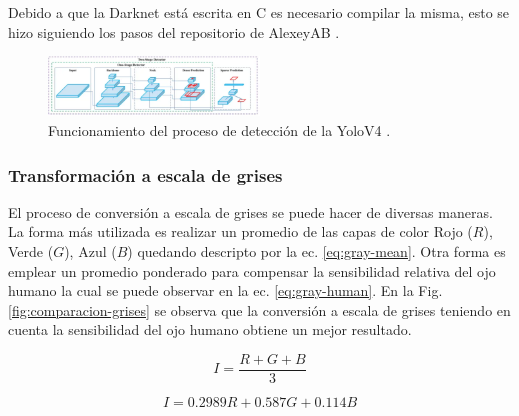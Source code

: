 Debido a que la Darknet está escrita en C es necesario compilar la misma, esto se hizo siguiendo los pasos del repositorio de AlexeyAB \cite{alexey_yolo_2023}.


\begin{figure}[bth]
    \centering
    \includegraphics[width=0.5\textwidth]{imgs/funcionamiento-yolo.png}
    \caption{Funcionamiento del proceso de detección de la YoloV4 \cite{bochkovskiy_yolov4_2020}.}
    \label{fig:funcionamiento-yolo}
\end{figure}

\subsubsection{Transformación a escala de grises}

El proceso de conversión a escala de grises se puede hacer de diversas maneras. La forma más utilizada es realizar un promedio de las capas de color Rojo ($R$), Verde ($G$), Azul ($B$) quedando descripto por la ec. \ref{eq:gray-mean}.
Otra forma es emplear un promedio ponderado para compensar la sensibilidad relativa del ojo humano la cual se puede observar en la ec. \ref{eq:gray-human}. En la Fig. \ref{fig:comparacion-grises} se observa que la conversión a escala de grises teniendo en cuenta la sensibilidad del ojo humano obtiene un mejor resultado.

\begin{equation}
    \label{eq:gray-mean}
    I = \frac{R + G + B}{3}
\end{equation}

\begin{equation}
    \label{eq:gray-human}
    I = 0.2989R + 0.587G + 0.114B
\end{equation}

